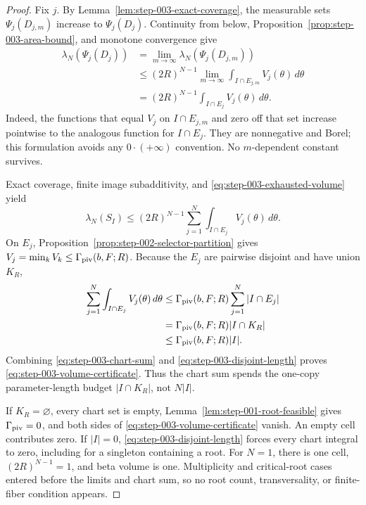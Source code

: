 \begin{proof}
Fix $j$.  By Lemma~\ref{lem:step-003-exact-coverage}, the measurable sets
$\Psi_j(D_{j,m})$ increase to $\Psi_j(D_j)$.  Continuity from below,
Proposition~\ref{prop:step-003-area-bound}, and monotone convergence give
\begin{equation}
\begin{aligned}
\lambda_N(\Psi_j(D_j))
&=\lim_{m\to\infty}\lambda_N(\Psi_j(D_{j,m}))\\
&\leq(2R)^{N-1}\lim_{m\to\infty}
\int_{I\cap E_{j,m}}V_j(\theta)\,d\theta\\
&=(2R)^{N-1}\int_{I\cap E_j}V_j(\theta)\,d\theta.
\end{aligned}
\label{eq:step-003-exhausted-volume}
\end{equation}
Indeed, the functions that equal $V_j$ on $I\cap E_{j,m}$ and zero off
that set increase pointwise to the analogous function for $I\cap E_j$.
They are nonnegative and Borel; this formulation avoids any
$0\cdot(+\infty)$ convention.  No $m$-dependent constant survives.

Exact coverage, finite image subadditivity, and
\eqref{eq:step-003-exhausted-volume} yield
\begin{equation}
\lambda_N(S_I)
\leq(2R)^{N-1}
\sum_{j=1}^N\int_{I\cap E_j}V_j(\theta)\,d\theta.
\label{eq:step-003-chart-sum}
\end{equation}
On $E_j$, Proposition~\ref{prop:step-002-selector-partition} gives
$V_j=\min_kV_k\leq\Gamma_{\rm piv}(b,F;R)$.  Because the $E_j$ are
pairwise disjoint and have union $K_R$,
\begin{equation}
\begin{aligned}
\sum_{j=1}^N\int_{I\cap E_j}V_j(\theta)\,d\theta
&\leq\Gamma_{\rm piv}(b,F;R)\sum_{j=1}^N|I\cap E_j|\\
&=\Gamma_{\rm piv}(b,F;R)|I\cap K_R|\\
&\leq\Gamma_{\rm piv}(b,F;R)|I|.
\end{aligned}
\label{eq:step-003-disjoint-length}
\end{equation}
Combining \eqref{eq:step-003-chart-sum} and
\eqref{eq:step-003-disjoint-length} proves
\eqref{eq:step-003-volume-certificate}.  Thus the chart sum spends the
one-copy parameter-length budget $|I\cap K_R|$, not $N|I|$.

If $K_R=\varnothing$, every chart set is empty,
Lemma~\ref{lem:step-001-root-feasible} gives $\Gamma_{\rm piv}=0$, and both
sides of \eqref{eq:step-003-volume-certificate} vanish.  An empty cell
contributes zero.  If $|I|=0$,
\eqref{eq:step-003-disjoint-length} forces every chart integral to zero,
including for a singleton containing a root.  For $N=1$, there is one cell,
$(2R)^{N-1}=1$, and beta volume is one.  Multiplicity and critical-root
cases entered before the limits and chart sum, so no root count,
transversality, or finite-fiber condition appears.
\end{proof}

